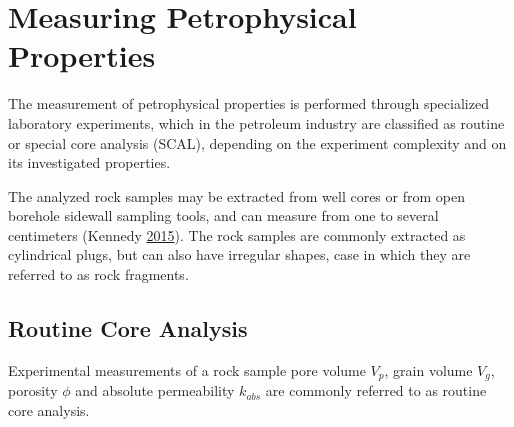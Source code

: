 \documentclass[english,msc,numbers]{coppe}
\begin{document}
  \hypertarget{petrophysical-properties}{%
  \chapter{Measuring Petrophysical Properties}\label{petrophysical-properties}}
  
  The measurement of petrophysical properties is performed through specialized laboratory experiments, which in the petroleum industry are classified as routine or special core analysis (SCAL), depending on the experiment complexity and on its investigated properties.
  
  The analyzed rock samples may be extracted from well cores or from open borehole sidewall sampling tools, and can measure from one to several centimeters (Kennedy \protect\hyperlink{ref-Kennedy2015}{2015}). The rock samples are commonly extracted as cylindrical plugs, but can also have irregular shapes, case in which they are referred to as rock fragments.
  
  \hypertarget{routine-core-analysis}{%
  \section{Routine Core Analysis}\label{routine-core-analysis}}
  
  Experimental measurements of a rock sample pore volume \(V_p\), grain volume \(V_g\), porosity \(\phi\) and absolute permeability \(k_{abs}\) are commonly referred to as routine core analysis.
  
\end{document}
